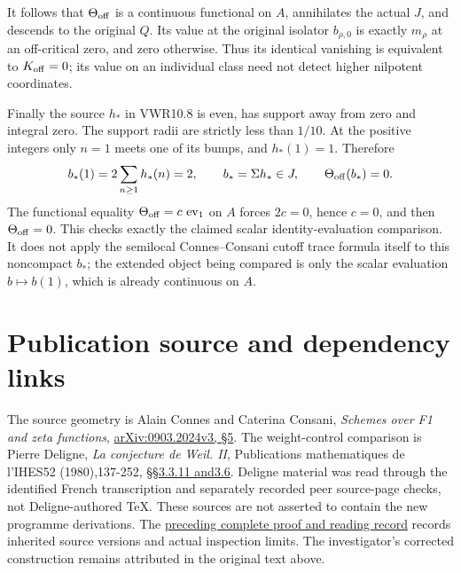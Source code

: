 It follows that \(\Theta_{\rm off}\) is a continuous functional on
\(A\), annihilates the actual \(J\), and descends to the original \(Q\).
Its value at the original isolator \(b_{\rho,0}\) is exactly \(m_\rho\)
at an off-critical zero, and zero otherwise. Thus its identical
vanishing is equivalent to \(K_{\rm off}=0\); its value on an individual
class need not detect higher nilpotent coordinates.

Finally the source \(h_*\) in VWR10.8 is even, has support away from
zero and integral zero. The support radii are strictly less than
\(1/10\). At the positive integers only \(n=1\) meets one of its bumps,
and \(h_*(1)=1\). Therefore \[
b_*(1)=2\sum_{n\geq1}h_*(n)=2,\qquad
b_*=\Sigma h_*\in J,\qquad \Theta_{\rm off}(b_*)=0.
\] The functional equality \(\Theta_{\rm off}=c\,\operatorname{ev}_1\)
on \(A\) forces \(2c=0\), hence \(c=0\), and then
\(\Theta_{\rm off}=0\). This checks exactly the claimed scalar
identity-evaluation comparison. It does not apply the semilocal
Connes--Consani cutoff trace formula itself to this noncompact \(b_*\);
the extended object being compared is only the scalar evaluation
\(b\mapsto b(1)\), which is already continuous on \(A\).

\section{Publication source and dependency
links}\label{publication-source-and-dependency-links-11}

The source geometry is Alain Connes and Caterina Consani, \emph{Schemes
over F1 and zeta functions},
\href{https://arxiv.org/abs/0903.2024v3}{arXiv:0903.2024v3, §5}. The
weight-control comparison is Pierre Deligne, \emph{La conjecture de
Weil. II}, Publications mathematiques de l'IHES52 (1980),137-252,
\href{https://www.numdam.org/item/PMIHES_1980__52__137_0/}{§§3.3.11
and3.6}. Deligne material was read through the identified French
transcription and separately recorded peer source-page checks, not
Deligne-authored TeX. These sources are not asserted to contain the new
programme derivations. The
\href{https://github.com/KokunoYumeto/zeta-function-research-reader/blob/36a82ecca98addb8a98b48204e349737856c7223/workbenches/splitzero-tandem/continuations/20260924-cohomology-weight-and-character-lifts/BUILD_AND_REVIEW.md}{preceding
complete proof and reading record} records inherited source versions and
actual inspection limits. The investigator's corrected construction
remains attributed in the original text above.

